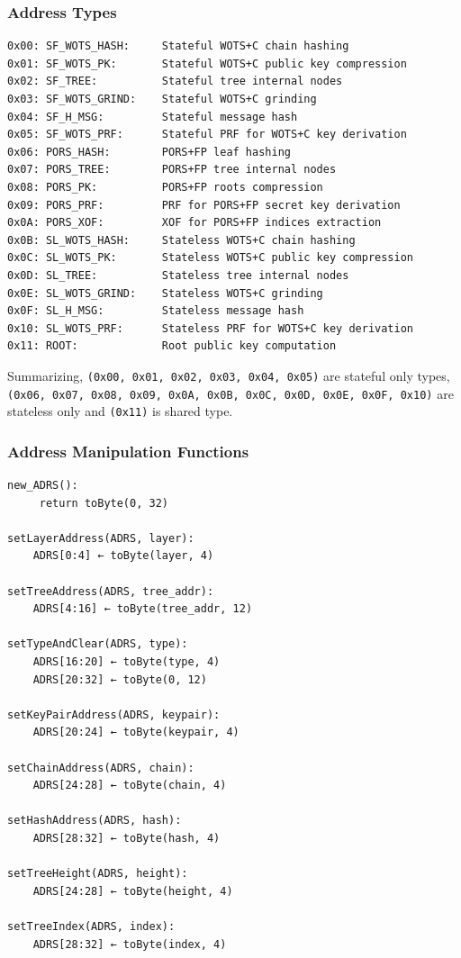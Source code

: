 \subsubsection{Address Types}
\begin{verbatim}
0x00: SF_WOTS_HASH:     Stateful WOTS+C chain hashing
0x01: SF_WOTS_PK:       Stateful WOTS+C public key compression
0x02: SF_TREE:          Stateful tree internal nodes
0x03: SF_WOTS_GRIND:    Stateful WOTS+C grinding
0x04: SF_H_MSG:         Stateful message hash
0x05: SF_WOTS_PRF:      Stateful PRF for WOTS+C key derivation
0x06: PORS_HASH:        PORS+FP leaf hashing
0x07: PORS_TREE:        PORS+FP tree internal nodes
0x08: PORS_PK:          PORS+FP roots compression
0x09: PORS_PRF:         PRF for PORS+FP secret key derivation
0x0A: PORS_XOF:         XOF for PORS+FP indices extraction
0x0B: SL_WOTS_HASH:     Stateless WOTS+C chain hashing
0x0C: SL_WOTS_PK:       Stateless WOTS+C public key compression
0x0D: SL_TREE:          Stateless tree internal nodes
0x0E: SL_WOTS_GRIND:    Stateless WOTS+C grinding
0x0F: SL_H_MSG:         Stateless message hash
0x10: SL_WOTS_PRF:      Stateless PRF for WOTS+C key derivation
0x11: ROOT:             Root public key computation
\end{verbatim}
Summarizing, \texttt{(0x00, 0x01, 0x02, 0x03, 0x04, 0x05)} are stateful only types, \texttt{(0x06, 0x07, 0x08, 0x09, 0x0A, 0x0B, 0x0C, 0x0D, 0x0E, 0x0F, 0x10)} are stateless only and \texttt{(0x11)} is shared type. 

\subsubsection{Address Manipulation Functions}
\begin{verbatim}
new_ADRS():
     return toByte(0, 32)

setLayerAddress(ADRS, layer):
    ADRS[0:4] ← toByte(layer, 4)

setTreeAddress(ADRS, tree_addr):
    ADRS[4:16] ← toByte(tree_addr, 12)

setTypeAndClear(ADRS, type):
    ADRS[16:20] ← toByte(type, 4)
    ADRS[20:32] ← toByte(0, 12)

setKeyPairAddress(ADRS, keypair):
    ADRS[20:24] ← toByte(keypair, 4)

setChainAddress(ADRS, chain):
    ADRS[24:28] ← toByte(chain, 4)

setHashAddress(ADRS, hash):
    ADRS[28:32] ← toByte(hash, 4)

setTreeHeight(ADRS, height):
    ADRS[24:28] ← toByte(height, 4)

setTreeIndex(ADRS, index):
    ADRS[28:32] ← toByte(index, 4)
\end{verbatim}

